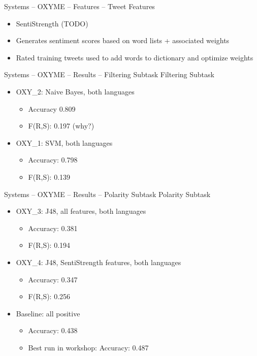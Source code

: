 \documentclass[12pt,a4paper]{beamer}
\begin{document}
\begin{frame}{Systems -- OXYME -- Features -- Tweet Features}
\begin{itemize}
\item SentiStrength (TODO)
\item Generates sentiment scores based on word lists + associated weights
\item Rated training tweets used to add words to dictionary and optimize weights
\end{itemize}

\end{frame}

\begin{frame}{Systems -- OXYME -- Results -- Filtering Subtask}
Filtering Subtask
\begin{itemize}
\item OXY\_2: Naive Bayes, both languages
  \begin{itemize}
  \item Accuracy 0.809
  \item F(R,S): 0.197 (why?)
  \end{itemize}
\item OXY\_1: SVM, both languages
  \begin{itemize}
  \item Accuracy: 0.798
  \item F(R,S): 0.139
  \end{itemize}
\end{itemize}

\end{frame}

\begin{frame}{Systems -- OXYME -- Results -- Polarity Subtask}
Polarity Subtask
\begin{itemize}
\item OXY\_3: J48, all features, both languages
  \begin{itemize}
  \item Accuracy: 0.381
  \item F(R,S): 0.194
  \end{itemize}
\item OXY\_4: J48, SentiStrength features, both languages
  \begin{itemize}
   \item Accuracy: 0.347
   \item F(R,S): 0.256
  \end{itemize}
\item Baseline: all positive
  \begin{itemize}
  \item Accuracy: 0.438
  \item Best run in workshop: Accuracy: 0.487
  \end{itemize}
\end{itemize}

\end{frame}
\end{document}
